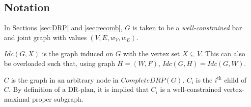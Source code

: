 \subsection{Notation}

In Sections \ref{sec:DRP} and \ref{sec:recomb}, $G$ is taken to be a \emph{well-constrained} bar and joint graph with values $(V,E,w_V,w_E)$.

$Idc(G,X)$ is the graph induced on $G$ with the vertex set $X\subseteq V$. This can also be overloaded such that, using graph $H=(W,F)$, $Idc(G,H)=Idc(G,W)$.

$C$ is the graph in an arbitrary node in $CompleteDRP(G)$. $C_i$ is the $i^{\text{th}}$ child of $C$. By definition of a DR-plan, it is implied that $C_i$ is a well-constrained vertex-maximal proper subgraph.
